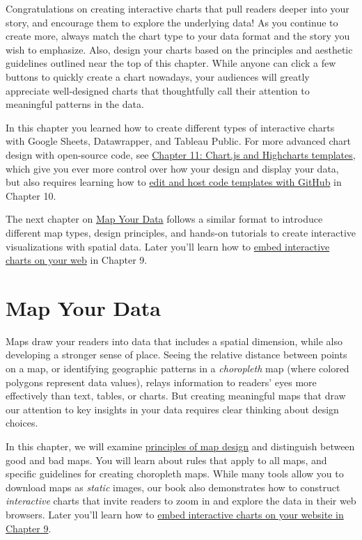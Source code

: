 \documentclass[
  english,
]{book}
\begin{document}
Congratulations on creating interactive charts that pull readers deeper into your story, and encourage them to explore the underlying data! As you continue to create more, always match the chart type to your data format and the story you wish to emphasize. Also, design your charts based on the principles and aesthetic guidelines outlined near the top of this chapter. While anyone can click a few buttons to quickly create a chart nowadays, your audiences will greatly appreciate well-designed charts that thoughtfully call their attention to meaningful patterns in the data.

In this chapter you learned how to create different types of interactive charts with Google Sheets, Datawrapper, and Tableau Public. For more advanced chart design with open-source code, see \href{chartcode.html}{Chapter 11: Chart.js and Highcharts templates}, which give you ever more control over how your design and display your data, but also requires learning how to \href{github.html}{edit and host code templates with GitHub} in Chapter 10.

The next chapter on \href{map.html}{Map Your Data} follows a similar format to introduce different map types, design principles, and hands-on tutorials to create interactive visualizations with spatial data. Later you'll learn how to \href{embed.html}{embed interactive charts on your web} in Chapter 9.

\hypertarget{map}{%
\chapter{Map Your Data}\label{map}}

Maps draw your readers into data that includes a spatial dimension, while also developing a stronger sense of place. Seeing the relative distance between points on a map, or identifying geographic patterns in a \emph{choropleth} map (where colored polygons represent data values), relays information to readers' eyes more effectively than text, tables, or charts. But creating meaningful maps that draw our attention to key insights in your data requires clear thinking about design choices.

In this chapter, we will examine \href{map-design.html}{principles of map design} and distinguish between good and bad maps. You will learn about rules that apply to all maps, and specific guidelines for creating choropleth maps. While many tools allow you to download maps as \emph{static} images, our book also demonstrates how to construct \emph{interactive} charts that invite readers to zoom in and explore the data in their web browsers. Later you'll learn how to \href{embed.html}{embed interactive charts on your website in Chapter 9}.
\end{document}
